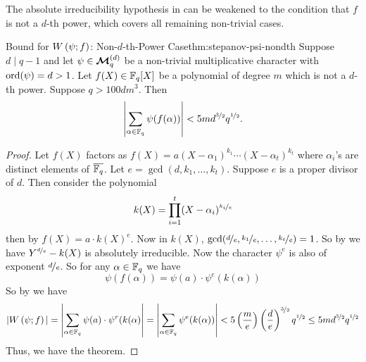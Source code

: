 The absolute irreducibility hypothesis in \StepanovPsiIrrthm can be weakened to the condition that $f$ is not a $d$-th power, which covers all remaining non-trivial cases.
\begin{Theorem}{Bound for $W\left(\psi;f\right)$: Non-$d$-th-Power Case}{thm:stepanov-psi-nondth}
  Suppose $d\mid q-1$ and let $\psi\in\boldsymbol{\mathcal{M}}_q^{(d)}$ be a non-trivial multiplicative character with $\operatorname{ord}(\psi)=d>1$. Let $f(X)\in\mathbb{F}_q[X]$ be a polynomial of degree $m$ which is not a $d$-th power. Suppose $q>100dm^3$. Then $$\left|\sum_{\alpha\in\mathbb{F}_q}\psi(f(\alpha))\right|<5md^{\nicefrac{3}{2}}q^{\nicefrac12}.$$
\end{Theorem}
\begin{proof}
  Let $f(X)$ factors as $f(X)=a(X-\alpha_1)^{k_1}\cdots (X-\alpha_t)^{k_t}$ where $\alpha_i$'s are distinct elements of $\overline{\mathbb{F}_q}$. Let $e=\gcd(d,k_1,\dots, k_t)$. Suppose $e$ is a proper divisor of $d$. Then consider the polynomial $$k(X)=\prod_{i=1}^t(X-\alpha_i)^{\nicefrac{k_i}e}$$then by \DthPowerCharlem $f(X)=a\cdot k(X)^e$. Now in $k(X)$, $\gcd(\nicefrac{d}e,\nicefrac{k_1}e,\dots,\nicefrac{k_t}e)=1$. So by \YdFxIrrthm we have $Y^{\nicefrac{d}e}-k(X)$ is absolutely irreducible. Now the character $\psi^e$ is also of exponent $\nicefrac{d}e$. So for any $\alpha\in\mathbb{F}_q$ we have $$\psi(f(\alpha))=\psi(a)\cdot \psi^e(k(\alpha))$$So by \StepanovPsiIrrthm we have $$|W\left(\psi;f\right)|=\left|\sum_{\alpha\in\mathbb{F}_q}\psi(a)\cdot \psi^r(k(\alpha)\right|=\left|\sum_{\alpha\in\mathbb{F}_q}\psi^e(k(\alpha))\right|<5\left(\frac{m}e\right)\left(\frac{d}e\right)^{\nicefrac{3}{2}}q^{\nicefrac12}\leq 5md^{\nicefrac{3}{2}}q^{\nicefrac12}$$Thus, we have the theorem.
\end{proof}